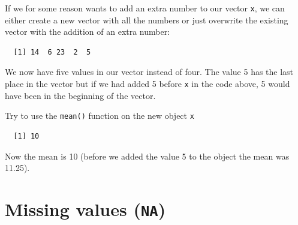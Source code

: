 \documentclass[12pt,oneside]{reedthesis}
\theoremstyle{definition}
\theoremstyle{definition}
\theoremstyle{definition}
\theoremstyle{remark}
\begin{document}
  If we for some reason wants to add an extra number to our vector
  \texttt{x}, we can either create a new vector with all the numbers or
  just overwrite the existing vector with the addition of an extra number:
  \begin{Shaded}
  \begin{Highlighting}[]
  \StringTok{ }\NormalTok{)}
  \end{Highlighting}
  \end{Shaded}
  \begin{verbatim}
  [1] 14  6 23  2  5
  \end{verbatim}
  We now have five values in our vector instead of four. The value 5 has
  the last place in the vector but if we had added 5 before \texttt{x} in
  the code above, 5 would have been in the beginning of the vector.
  
  Try to use the \texttt{mean()} function on the new object \texttt{x}
  \begin{Shaded}
  \begin{Highlighting}[]
  \end{Highlighting}
  \end{Shaded}
  \begin{verbatim}
  [1] 10
  \end{verbatim}
  Now the mean is 10 (before we added the value 5 to the object the mean
  was 11.25).
  
  \section{\texorpdfstring{Missing values
  (\texttt{NA})}{Missing values (NA)}}\label{missing-values-na}
  
\end{document}
